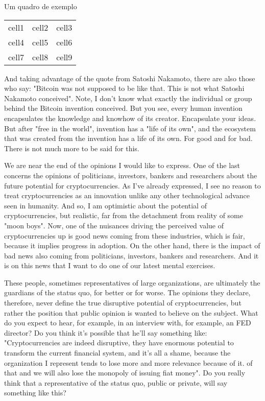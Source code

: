\begin{quadro}[!hbt]
  \caption{Um quadro de exemplo}
  \begin{center}
    \begin{tabular}{ |c|c|c| }
      \hline
      cell1 & cell2 & cell3 \\
      cell4 & cell5 & cell6 \\
      cell7 & cell8 & cell9 \\
      \hline
    \end{tabular}
  \end{center}
  \label{quadro-exemplo}
\end{quadro}

And taking advantage of the quote from Satoshi Nakamoto, there are also those who say: "Bitcoin was not supposed to be like that. This is not what Satoshi Nakamoto conceived". Note, I don't know what exactly the individual or group behind the Bitcoin invention conceived. But you see, every human invention encapsulates the knowledge and knowhow of its creator. Encapsulate your ideas. But after "free in the world", invention has a "life of its own", and the ecosystem that was created from the invention has a life of its own. For good and for bad. There is not much more to be said for this.

We are near the end of the opinions I would like to express. One of the last concerns the opinions of politicians, investors, bankers and researchers about the future potential for cryptocurrencies. As I've already expressed, I see no reason to treat cryptocurrencies as an innovation unlike any other technological advance seen in humanity. And so, I am optimistic about the potential of cryptocurrencies, but realistic, far from the detachment from reality of some "moon boys". Now, one of the nuisances driving the perceived value of cryptocurrencies up is good news coming from these industries, which is fair, because it implies progress in adoption. On the other hand, there is the impact of bad news also coming from politicians, investors, bankers and researchers. And it is on this news that I want to do one of our latest mental exercises.

These people, sometimes representatives of large organizations, are ultimately the guardians of the status quo, for better or for worse. The opinions they declare, therefore, never define the true disruptive potential of cryptocurrencies, but rather the position that public opinion is wanted to believe on the subject. What do you expect to hear, for example, in an interview with, for example, an FED director? Do you think it's possible that he'll say something like: "Cryptocurrencies are indeed disruptive, they have enormous potential to transform the current financial system, and it's all a shame, because the organization I represent tends to lose more and more relevance because of it. of that and we will also lose the monopoly of issuing fiat money". Do you really think that a representative of the status quo, public or private, will say something like this?

